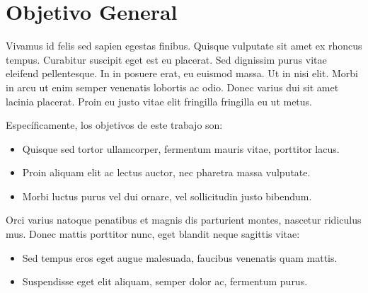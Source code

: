 


\section{Objetivo General}

Vivamus id felis sed sapien egestas finibus. Quisque vulputate sit amet ex rhoncus tempus. Curabitur suscipit eget est eu placerat. Sed dignissim purus vitae eleifend pellentesque. In in posuere erat, eu euismod massa. Ut in nisi elit. Morbi in arcu ut enim semper venenatis lobortis ac odio. Donec varius dui sit amet lacinia placerat. Proin eu justo vitae elit fringilla fringilla eu ut metus. 

Específicamente, los objetivos de este trabajo son:

\begin{itemize}
\item[•] Quisque sed tortor ullamcorper, fermentum mauris vitae, porttitor lacus.
\item[•] Proin aliquam elit ac lectus auctor, nec pharetra massa vulputate.
\item[•] Morbi luctus purus vel dui ornare, vel sollicitudin justo bibendum.

\end{itemize}

Orci varius natoque penatibus et magnis dis parturient montes, nascetur ridiculus mus. Donec mattis porttitor nunc, eget blandit neque sagittis vitae:
\begin{itemize}

\item[•] Sed tempus eros eget augue malesuada, faucibus venenatis quam mattis.
\item[•] Suspendisse eget elit aliquam, semper dolor ac, fermentum purus.
\end{itemize}

